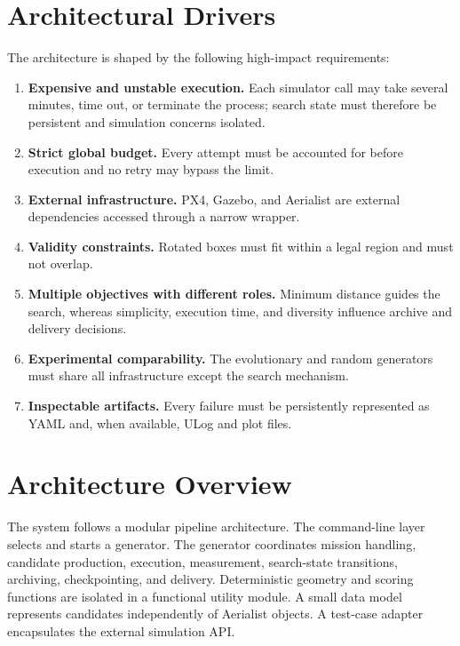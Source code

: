 \documentclass[11pt,a4paper,openany]{report}
\begin{document}
\section{Architectural Drivers}
The architecture is shaped by the following high-impact requirements:
\begin{enumerate}
  \item \textbf{Expensive and unstable execution.} Each simulator call may take several minutes, time out, or terminate the process; search state must therefore be persistent and simulation concerns isolated.
  \item \textbf{Strict global budget.} Every attempt must be accounted for before execution and no retry may bypass the limit.
  \item \textbf{External infrastructure.} PX4, Gazebo, and Aerialist are external dependencies accessed through a narrow wrapper.
  \item \textbf{Validity constraints.} Rotated boxes must fit within a legal region and must not overlap.
  \item \textbf{Multiple objectives with different roles.} Minimum distance guides the search, whereas simplicity, execution time, and diversity influence archive and delivery decisions.
  \item \textbf{Experimental comparability.} The evolutionary and random generators must share all infrastructure except the search mechanism.
  \item \textbf{Inspectable artifacts.} Every failure must be persistently represented as YAML and, when available, ULog and plot files.
\end{enumerate}

\section{Architecture Overview}
The system follows a modular pipeline architecture. The command-line layer selects and starts a generator. The generator coordinates mission handling, candidate production, execution, measurement, search-state transitions, archiving, checkpointing, and delivery. Deterministic geometry and scoring functions are isolated in a functional utility module. A small data model represents candidates independently of Aerialist objects. A test-case adapter encapsulates the external simulation API.
\end{document}
